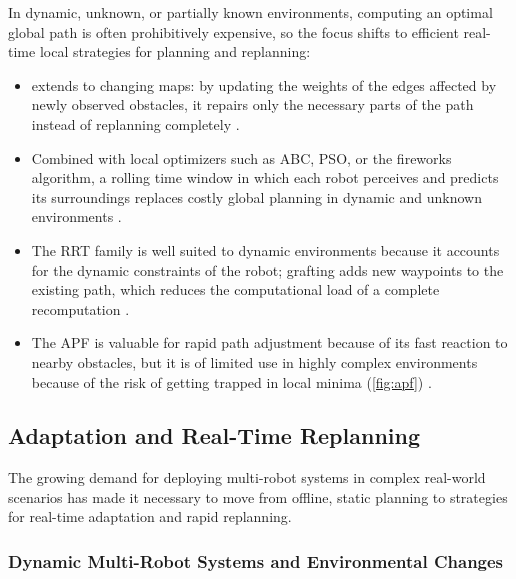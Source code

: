 In dynamic, unknown, or partially known environments, computing an optimal global
path is often prohibitively expensive, so the focus shifts to efficient real-time
local strategies for planning and replanning:
\begin{itemize}
  \item {} \Dstar{} extends
        \Astar{} to changing maps: by updating the weights of the edges affected
        by newly observed obstacles, it repairs only the necessary parts of the
        path instead of replanning completely \cite{stentz1994optimal,koenig2002d}.
  \item {} Combined with local optimizers such as ABC,
        PSO, or the fireworks algorithm, a rolling time window in which each
        robot perceives and predicts its surroundings replaces costly global
        planning in dynamic and unknown environments \cite{tan2016handbook}.
  \item {} The RRT family is well suited to
        dynamic environments because it accounts for the dynamic constraints of
        the robot; grafting adds new waypoints to the existing path, which
        reduces the computational load of a complete recomputation
        \cite{li2021rrt}.
  \item {} The APF is valuable for rapid path
        adjustment because of its fast reaction to nearby obstacles, but it is of
        limited use in highly complex environments because of the risk of getting
        trapped in local minima (\cref{fig:apf}) \cite{zhang2023multi}.
\end{itemize}

\subsection{Adaptation and Real-Time Replanning}

The growing demand for deploying multi-robot systems in complex real-world
scenarios has made it necessary to move from offline, static planning to
strategies for real-time adaptation and rapid replanning.

\subsubsection{Dynamic Multi-Robot Systems and Environmental Changes}

